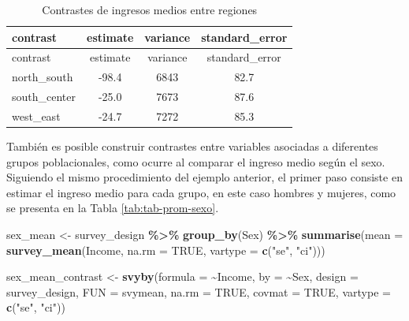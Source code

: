\documentclass[
  spanish,
  12pt,
]{book}
\newenvironment{Shaded}{\begin{snugshade}}{\end{snugshade}}
\newcommand{\AttributeTok}[1]{\textcolor[rgb]{0.13,0.29,0.53}{#1}}
\newcommand{\ConstantTok}[1]{\textcolor[rgb]{0.56,0.35,0.01}{#1}}
\newcommand{\FunctionTok}[1]{\textcolor[rgb]{0.13,0.29,0.53}{\textbf{#1}}}
\newcommand{\NormalTok}[1]{#1}
\newcommand{\OtherTok}[1]{\textcolor[rgb]{0.56,0.35,0.01}{#1}}
\newcommand{\SpecialCharTok}[1]{\textcolor[rgb]{0.81,0.36,0.00}{\textbf{#1}}}
\newcommand{\StringTok}[1]{\textcolor[rgb]{0.31,0.60,0.02}{#1}}
\begin{document}
\begin{longtable}[]{@{}lccc@{}}
\caption{\label{tab:tab-contraste-regiones}Contrastes de ingresos medios entre regiones}\tabularnewline
\toprule\noalign{}
contrast & estimate & variance & standard\_error \\
\midrule\noalign{}
\endfirsthead
\toprule\noalign{}
contrast & estimate & variance & standard\_error \\
\midrule\noalign{}
\endhead
\bottomrule\noalign{}
\endlastfoot
north\_south & -98.4 & 6843 & 82.7 \\
south\_center & -25.0 & 7673 & 87.6 \\
west\_east & -24.7 & 7272 & 85.3 \\
\end{longtable}

También es posible construir contrastes entre variables asociadas a diferentes grupos poblacionales, como ocurre al comparar el ingreso medio según el sexo. Siguiendo el mismo procedimiento del ejemplo anterior, el primer paso consiste en estimar el ingreso medio para cada grupo, en este caso hombres y mujeres, como se presenta en la Tabla \ref{tab:tab-prom-sexo}.

\begin{Shaded}
\begin{Highlighting}[]
\NormalTok{sex\_mean }\OtherTok{\textless{}{-}}\NormalTok{ survey\_design }\SpecialCharTok{\%\textgreater{}\%}
  \FunctionTok{group\_by}\NormalTok{(Sex) }\SpecialCharTok{\%\textgreater{}\%}
  \FunctionTok{summarise}\NormalTok{(}\AttributeTok{mean =} \FunctionTok{survey\_mean}\NormalTok{(Income,}
                               \AttributeTok{na.rm =} \ConstantTok{TRUE}\NormalTok{,}
                               \AttributeTok{vartype =} \FunctionTok{c}\NormalTok{(}\StringTok{"se"}\NormalTok{, }\StringTok{"ci"}\NormalTok{)))}

\NormalTok{sex\_mean\_contrast }\OtherTok{\textless{}{-}} \FunctionTok{svyby}\NormalTok{(}\AttributeTok{formula =} \SpecialCharTok{\textasciitilde{}}\NormalTok{Income,}
                           \AttributeTok{by =} \SpecialCharTok{\textasciitilde{}}\NormalTok{Sex,}
                           \AttributeTok{design =}\NormalTok{ survey\_design,}
                           \AttributeTok{FUN =}\NormalTok{ svymean,}
                           \AttributeTok{na.rm =} \ConstantTok{TRUE}\NormalTok{,}
                           \AttributeTok{covmat =} \ConstantTok{TRUE}\NormalTok{,}
                           \AttributeTok{vartype =} \FunctionTok{c}\NormalTok{(}\StringTok{"se"}\NormalTok{, }\StringTok{"ci"}\NormalTok{))}
\end{Highlighting}
\end{Shaded}
\end{document}
